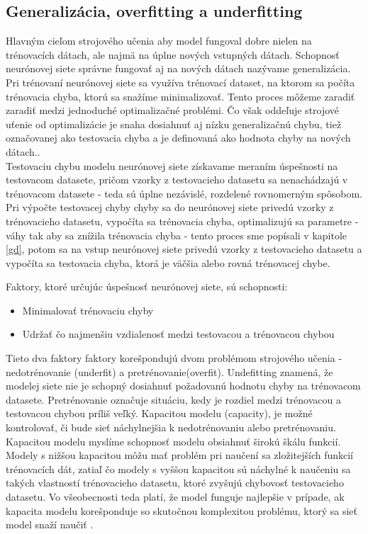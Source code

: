\subsection{Generalizácia, overfitting a underfitting}
Hlavným cieľom strojového učenia aby model fungoval dobre nielen na trénovacích dátach, ale najmä 
na úplne nových vstupných dátach.
Schopnosť neurónovej siete správne fungovať aj na nových dátach nazývame generalizácia. \\

\indent Pri trénovaní neurónovej siete sa využíva trénovací dataset, na ktorom sa počíta trénovacia chyba, ktorú sa snažíme minimalizovať.
Tento proces môžeme zaradiť zaradiť medzi jednoduché optimalizačné problémi.
Čo však oddeľuje strojové uťenie od optimalizácie je snaha dosiahnuť aj nízku generalizačnú chybu, tiež označovanej ako testovacia chyba a je  definovaná ako hodnota chyby na nových dátach.\cite{goodfellow2016deep}. \\

\indent Testovaciu chybu modelu neurónovej siete získavame meraním úspešnosti na testovacom datasete, pričom vzorky z testovacieho datasetu sa nenachádzajú v trénovacom datasete - teda sú úplne nezávislé, rozdelené rovnomerným spôsobom.
Pri výpočte testovacej chyby chyby sa do neurónovej siete privedú vzorky z trénovacieho datasetu, vypočíta sa trénovacia chyba, optimalizujú sa parametre - váhy tak aby sa znížila trénovacia chyba - tento proces sme popísali v kapitole \ref{gd}, potom sa na vstup neurónovej siete privedú vzorky z testovacieho datasetu a vypočíta sa testovacia chyba, ktorá je väčšia alebo rovná trénovacej chybe\cite{goodfellow2016deep}.

Faktory, ktoré určujúc úspešnosť neurónovej siete, sú schopnosti:

\begin{itemize}
	\item Minimalovať trénovaciu chyby
	\item Udržať čo najmenšiu vzdialenosť medzi testovacou a trénovacou chybou
\end{itemize}
\cite{goodfellow2016deep}

\indent Tieto dva faktory faktory korešpondujú dvom problémom strojového učenia - nedotrénovanie (underfit) a pretrénovanie(overfit).
Undefitting znamená, že modelej siete nie je schopný dosiahnuť požadovanú hodnotu chyby na trénovacom datasete.
Pretrénovanie označuje situáciu, kedy je rozdiel medzi trénovacou a testovacou chybou príliš veľký.
Kapacitou modelu (capacity), je možné kontrolovať, či bude sieť náchylnejšia k nedotrénovaniu alebo pretrénovaniu.
Kapacitou modelu myslíme schopnosť modelu obsiahnuť širokú škálu funkcií\cite{goodfellow2016deep}.
Modely s nižšou kapacitou môžu mať problém pri naučení sa zložitejších funkcií trénovacích dát,
zatiaľ čo modely s vyššou kapacitou sú náchylné k naučeniu sa takých vlastností trénovacieho datasetu, ktoré zvyšujú chybovosť testovacieho datasetu.
Vo všeobecnosti teda platí, že model funguje najlepšie v prípade, ak kapacita modelu korešponduje so skutočnou komplexitou problému, ktorý sa sieť model snaží naučiť \cite{lawrence1997lessons}. \\

